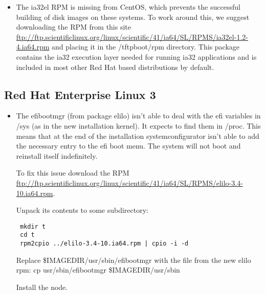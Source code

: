 \begin{itemize}

\item The ia32el RPM is missing from CentOS, which prevents the successful
building of disk images on these systems.  To work around this, we suggest
downloading the RPM from this site \url{ftp://ftp.scientificlinux.org/linux/scientific/41/ia64/SL/RPMS/ia32el-1.2-4.ia64.rpm}
and placing it in the /tftpboot/rpm directory.  This package contains the
ia32 execution layer needed for running ia32 applications and is included
in most other Red Hat based distributions by default.
\end{itemize}


\subsection{Red Hat Enterprise Linux 3}
\label{subsec:rhel3notes}

\begin{itemize}

\item The efibootmgr (from package elilo) isn't able to deal with the 
efi variables in /sys (as in the new installation kernel). It expects 
to find them in /proc. This means that at the end of the installation 
systemconfigurator isn't able to add the necessary entry to the efi 
boot menu. The system will not boot and reinstall itself indefinitely.

To fix this issue download the RPM \url{ftp://ftp.scientificlinux.org/linux/scientific/41/ia64/SL/RPMS/elilo-3.4-10.ia64.rpm}.

Unpack its contents to some subdirectory:
\begin{verbatim}
 mkdir t
 cd t
 rpm2cpio ../elilo-3.4-10.ia64.rpm | cpio -i -d
\end{verbatim}
Replace \$IMAGEDIR/usr/sbin/efibootmgr with the file from the new elilo rpm:
 cp usr/sbin/efibootmgr \$IMAGEDIR/usr/sbin

Install the node.

\end{itemize}


